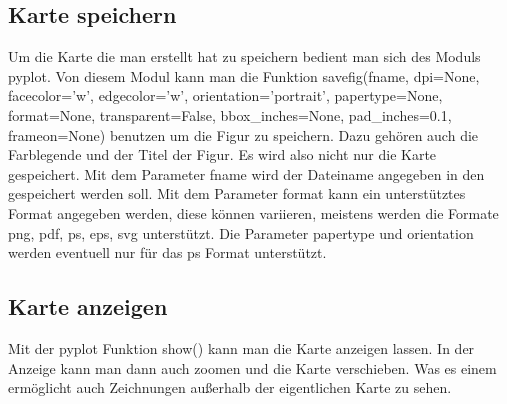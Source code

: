 \subsection{Karte speichern}
\label{sec:save}
Um die Karte die man erstellt hat zu speichern bedient man sich des Moduls \textsf{pyplot}. Von diesem Modul kann man die Funktion \textsf{savefig(fname, dpi=None, facecolor='w', edgecolor='w', orientation='portrait', papertype=None, format=None, transparent=False, bbox\_inches=None, pad\_inches=0.1, frameon=None)} benutzen um die Figur zu speichern. Dazu gehören auch die Farblegende und der Titel der Figur. Es wird also nicht nur die Karte gespeichert. Mit dem Parameter \textsf{fname} wird der Dateiname angegeben in den gespeichert werden soll. Mit dem Parameter \textsf{format} kann ein unterstütztes Format angegeben werden, diese können variieren, meistens werden die Formate \textsf{png, pdf, ps, eps, svg} unterstützt. Die Parameter \textsf{papertype} und \textsf{orientation} werden eventuell nur für das \textsf{ps} Format unterstützt.
\subsection{Karte anzeigen}
\label{sec:show}
Mit der \textsf{pyplot} Funktion \textsf{show()} kann man die Karte anzeigen lassen. In der Anzeige kann man dann auch zoomen und die Karte verschieben. Was es einem ermöglicht auch Zeichnungen außerhalb der eigentlichen Karte zu sehen.
